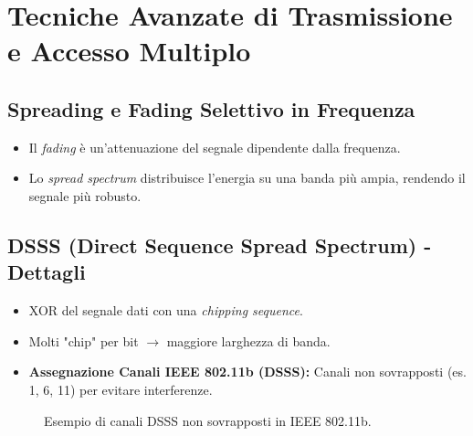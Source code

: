 \section{Tecniche Avanzate di Trasmissione e Accesso Multiplo}
\subsection{Spreading e Fading Selettivo in Frequenza}
\begin{itemize}
    \item Il \textit{fading} è un'attenuazione del segnale dipendente dalla frequenza.
    \item Lo \textit{spread spectrum} distribuisce l'energia su una banda più ampia, rendendo il segnale più robusto.
\end{itemize}

\subsection{DSSS (Direct Sequence Spread Spectrum) - Dettagli}
\begin{itemize}
    \item XOR del segnale dati con una \textit{chipping sequence}.
    \item Molti "chip" per bit $\rightarrow$ maggiore larghezza di banda.
    \item \textbf{Assegnazione Canali IEEE 802.11b (DSSS):} Canali non sovrapposti (es. 1, 6, 11) per evitare interferenze.
\end{itemize}
\begin{figure}[H]
\centering
{}
\caption{Esempio di canali DSSS non sovrapposti in IEEE 802.11b.}
\label{fig:dsss_channels}
\end{figure}

